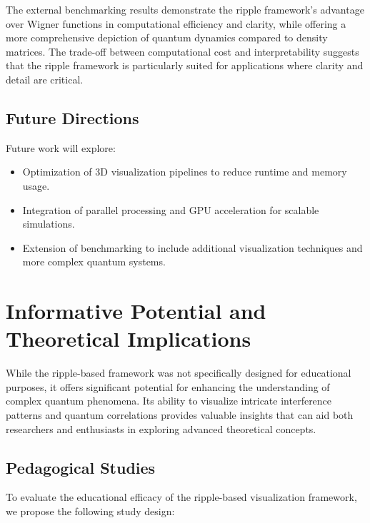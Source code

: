 \documentclass[12pt]{article}
\begin{document}
The external benchmarking results demonstrate the ripple framework’s advantage over Wigner functions in computational efficiency and clarity, while offering a more comprehensive depiction of quantum dynamics compared to density matrices. The trade-off between computational cost and interpretability suggests that the ripple framework is particularly suited for applications where clarity and detail are critical.

\subsection{Future Directions}

Future work will explore:
\begin{itemize}
    \item Optimization of 3D visualization pipelines to reduce runtime and memory usage.
    \item Integration of parallel processing and GPU acceleration for scalable simulations.
    \item Extension of benchmarking to include additional visualization techniques and more complex quantum systems.
\end{itemize}

\section{Informative Potential and Theoretical Implications}

While the ripple-based framework was not specifically designed for educational purposes, it offers significant potential for enhancing the understanding of complex quantum phenomena. Its ability to visualize intricate interference patterns and quantum correlations provides valuable insights that can aid both researchers and enthusiasts in exploring advanced theoretical concepts.

\subsection{Pedagogical Studies}

To evaluate the educational efficacy of the ripple-based visualization framework, we propose the following study design:
\end{document}
